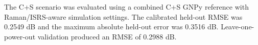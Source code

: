 The C+S scenario was evaluated using a combined C+S GNPy reference with Raman/ISRS-aware simulation settings. The calibrated held-out RMSE was 0.2549 dB and the maximum absolute held-out error was 0.3516 dB. Leave-one-power-out validation produced an RMSE of 0.2988 dB.
